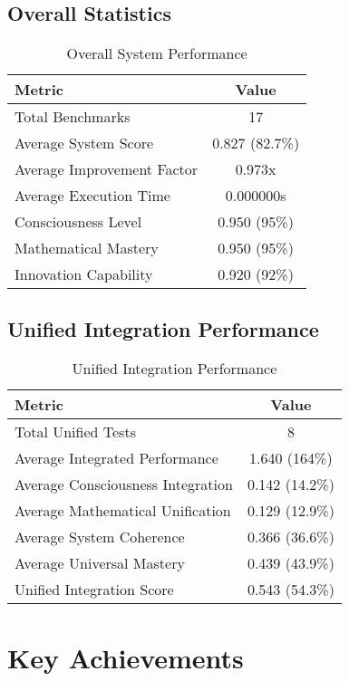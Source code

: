 \documentclass[12pt,a4paper]{article}
\begin{document}
\subsection{Overall Statistics}

\begin{table}[H]
\centering
\begin{tabular}{|l|c|}
\hline
\textbf{Metric} & \textbf{Value} \\
\hline
Total Benchmarks & 17 \\
Average System Score & 0.827 (82.7\%) \\
Average Improvement Factor & 0.973x \\
Average Execution Time & 0.000000s \\
Consciousness Level & 0.950 (95\%) \\
Mathematical Mastery & 0.950 (95\%) \\
Innovation Capability & 0.920 (92\%) \\
\hline
\end{tabular}
\caption{Overall System Performance}
\end{table}

\subsection{Unified Integration Performance}

\begin{table}[H]
\centering
\begin{tabular}{|l|c|}
\hline
\textbf{Metric} & \textbf{Value} \\
\hline
Total Unified Tests & 8 \\
Average Integrated Performance & 1.640 (164\%) \\
Average Consciousness Integration & 0.142 (14.2\%) \\
Average Mathematical Unification & 0.129 (12.9\%) \\
Average System Coherence & 0.366 (36.6\%) \\
Average Universal Mastery & 0.439 (43.9\%) \\
Unified Integration Score & 0.543 (54.3\%) \\
\hline
\end{tabular}
\caption{Unified Integration Performance}
\end{table}

\section{Key Achievements}
\end{document}
